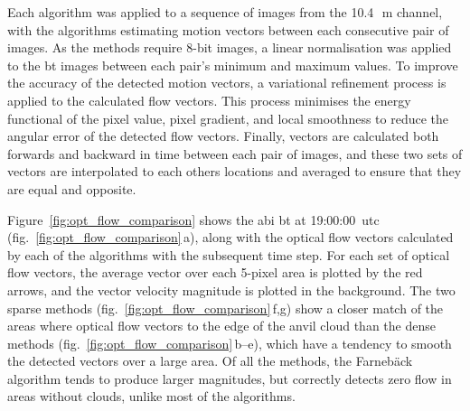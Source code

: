 Each algorithm was applied to a sequence of images from the 10.4\,\unit{\mu m} channel, with the algorithms estimating motion vectors between each consecutive pair of images.
As the methods require 8-bit images, a linear normalisation was applied to the \acrshort{bt} images between each pair's minimum and maximum values.
To improve the accuracy of the detected motion vectors, a variational refinement process \citep{brox_high_2004} is applied to the calculated flow vectors.
This process minimises the energy functional of the pixel value, pixel gradient, and local smoothness to reduce the angular error of the detected flow vectors.
Finally, vectors are calculated both forwards and backward in time between each pair of images, and these two sets of vectors are interpolated to each others locations and averaged to ensure that they are equal and opposite.

Figure~\ref{fig:opt_flow_comparison} shows the \acrshort{abi} \acrshort{bt} at 19:00:00~\acrshort{utc} (fig.~\ref{fig:opt_flow_comparison}\,a), along with the optical flow vectors calculated by each of the algorithms with the subsequent time step.
For each set of optical flow vectors, the average vector over each 5-pixel area is plotted by the red arrows, and the vector velocity magnitude is plotted in the background.
The two sparse methods (fig.~\ref{fig:opt_flow_comparison}\,f,g) show a closer match of the areas where optical flow vectors to the edge of the anvil cloud than the dense methods (fig.~\ref{fig:opt_flow_comparison}\,b--e), which have a tendency to smooth the detected vectors over a large area.
Of all the methods, the Farnebäck algorithm tends to produce larger magnitudes, but correctly detects zero flow in areas without clouds, unlike most of the algorithms.


